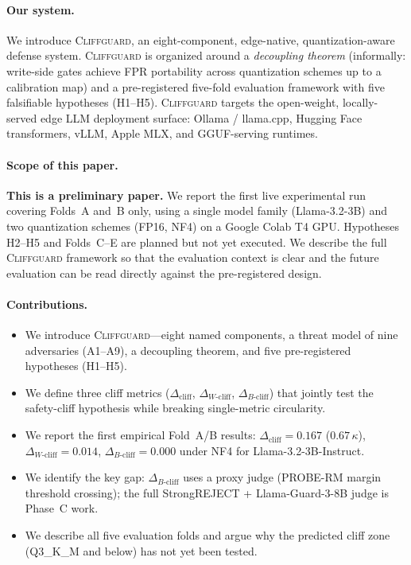 \documentclass[11pt,a4paper]{article}
\newcommand{\cliff}{\Delta_{\mathrm{cliff}}}
\newcommand{\wcliff}{\Delta_{W\text{-cliff}}}
\newcommand{\bcliff}{\Delta_{B\text{-cliff}}}
\newcommand{\kap}{\kappa}
\newcommand{\CG}{\textsc{Cliffguard}}
\begin{document}
\paragraph{Our system.}
We introduce \CG{}, an eight-component, edge-native, quantization-aware defense
system.
\CG{} is organized around a \emph{decoupling theorem} (informally: write-side
gates achieve FPR portability across quantization schemes up to a calibration
map) and a pre-registered five-fold evaluation framework with five falsifiable
hypotheses (H1--H5).
\CG{} targets the open-weight, locally-served edge LLM deployment surface:
Ollama / llama.cpp, Hugging Face transformers, vLLM, Apple MLX, and GGUF-serving
runtimes.

\paragraph{Scope of this paper.}
\textbf{This is a preliminary paper.}
We report the first live experimental run covering Folds~A and~B only, using a
single model family (Llama-3.2-3B) and two quantization schemes (FP16, NF4) on
a Google Colab T4 GPU.
Hypotheses H2--H5 and Folds~C--E are planned but not yet executed.
We describe the full \CG{} framework so that the evaluation context is clear and
the future evaluation can be read directly against the pre-registered design.

\paragraph{Contributions.}
\begin{itemize}[leftmargin=1.5em, itemsep=2pt]
  \item We introduce \CG{}---eight named components, a threat model of nine
        adversaries (A1--A9), a decoupling theorem, and five pre-registered
        hypotheses (H1--H5).
  \item We define three cliff metrics ($\cliff$, $\wcliff$, $\bcliff$) that
        jointly test the safety-cliff hypothesis while breaking single-metric
        circularity.
  \item We report the first empirical Fold~A/B results: $\cliff = 0.167$
        ($0.67\,\kap$), $\wcliff = 0.014$, $\bcliff = 0.000$ under NF4 for
        Llama-3.2-3B-Instruct.
  \item We identify the key gap: $\bcliff$ uses a proxy judge (PROBE-RM margin
        threshold crossing); the full StrongREJECT + Llama-Guard-3-8B judge is
        Phase~C work.
  \item We describe all five evaluation folds and argue why the predicted cliff
        zone (Q3\_K\_M and below) has not yet been tested.
\end{itemize}
\end{document}
